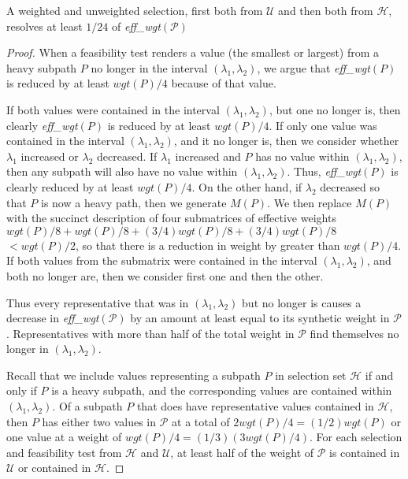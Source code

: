 \begin{lemma}
\label{lem:selection:reduction}
A weighted and unweighted selection, first both from $\mathcal{U}$ and then both from $\mathcal{H}$, resolves at least $1/24$ of {\it eff\_wgt}$(\mathcal{P})$
\end{lemma}
\begin{proof}
When a feasibility test renders a value (the smallest or largest)
from a heavy subpath $P$ no longer in the interval $(\lambda_1, \lambda_2)$,
we argue that {\it eff\_wgt}$(P)$ is reduced by at least $wgt(P)/4$
because of that value.

If both values were contained in the interval $(\lambda_1, \lambda_2)$,
but one no longer is, then clearly {\it eff\_wgt}$(P)$ is reduced by at least $wgt(P)/4$.
If only one value was contained in the interval $(\lambda_1, \lambda_2)$,
and it no longer is, then we consider whether $\lambda_1$ increased or $\lambda_2$ decreased. 
If $\lambda_1$ increased and $P$ has no value within $(\lambda_1, \lambda_2)$, then any subpath will also 
have no value within $(\lambda_1, \lambda_2)$. 
Thus, {\it eff\_wgt}$(P)$ is clearly reduced by at least $wgt(P)/4$. 
On the other hand, if $\lambda_2$ decreased so that $P$ is now a heavy path, then we generate $M(P)$. 
We then replace $M(P)$ with the succinct description of four submatrices of effective weights $wgt(P)/8 + wgt(P)/8 + (3/4)wgt(P)/8 + (3/4)wgt(P)/8$ $< wgt(P)/2$, so that there is a reduction in weight by greater than $wgt(P)/4$.
If both values from the submatrix were contained in the interval $(\lambda_1, \lambda_2)$,
and both no longer are, then we consider first one and then the other.

Thus every representative that was in $(\lambda_1, \lambda_2)$ but no longer is causes a decrease in {\it eff\_wgt}$(\mathcal{P})$ by an amount at least equal to its synthetic weight in $\mathcal{P}$.
Representatives with more than half of the total weight in $\mathcal{P}$ find themselves no longer in $(\lambda_1, \lambda_2)$.

Recall that we include values representing a subpath $P$ in selection set $\mathcal{H}$ if and only if $P$ is a heavy subpath, and the corresponding values are contained within $(\lambda_1, \lambda_2)$. 
Of a subpath $P$ that does have representative values contained in $\mathcal{H}$, then $P$ has either two values in $\mathcal{P}$ at a total of $2wgt(P)/4 = (1/2)wgt(P)$ or one value at a weight of $wgt(P)/4 = (1/3)(3wgt(P)/4)$. 
For each selection and feasibility test from $\mathcal{H}$ and $\mathcal{U}$, at least half of the weight of $\mathcal{P}$ is contained in $\mathcal{U}$ or contained in $\mathcal{H}$. 


\end{proof}
